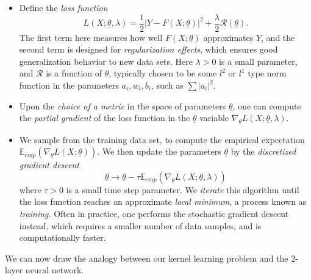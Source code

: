 \documentclass[a4paper]{article}
\theoremstyle{definition}
\newcommand{\E}{\mathbb{E}}
\newcommand{\1}{\mathbbm{1}}
\begin{document}
	
	\begin{itemize}
		\item Define the \emph{loss function} 
		\[
		L(X; \underline{\theta},\lambda )= \frac{1}{2} | Y- F(X; \underline{\theta})|^2 + \frac{\lambda}{2} \mathcal{R}(\underline{\theta}).
		\]
		The first term here measures how well $F(X;\underline{\theta})$ approximates $Y$, and the second term is designed for \emph{regularization effects}, which ensures good generalization behavior to new data sets. Here $\lambda>0$ is a small parameter, and $\mathcal{R}$ is a function of $\underline{\theta}$, typically chosen to be some $l^2$ or $l^1$ type norm function in the parameters $a_i, w_i, b_i$, such as $\sum |a_i|^2$.
		
		
		
		\item  Upon the \emph{choice of a  metric} in the space of parameters $\underline{\theta}$, one can compute the \emph{partial gradient} of the loss function in the $\underline{\theta}$ variable $\nabla_{\underline{\theta}} L(X;\underline{\theta},\lambda) $.
		
		
		\item We sample from the training data set, to compute the empirical expectation $\E_{emp}(  \nabla_{\underline{\theta}} L(X;\underline{\theta})  )$. We then update the parameters $\underline{\theta}$ by the \emph{discretized gradient descent}
		\[
		\underline{\theta}\to \underline{\theta}- \tau \E_{emp}(  \nabla_{\underline{\theta}} L(X;\underline{\theta},\lambda)  )
		\]
		where $\tau>0$ is a small time step parameter. We \emph{iterate} this algorithm until the loss function reaches an approximate \emph{local minimum}, a process known as \emph{training}. Often in practice, one performs the stochastic gradient descent instead, which requires a smaller number of data samples, and is computationally faster.
		
	\end{itemize}
	
	
	
	
	
	
	
	We can now draw the analogy between our kernel learning problem and the 2-layer neural network. 
	
\end{document}
